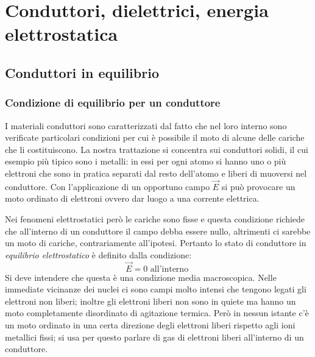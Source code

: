 \documentclass[class=book, crop=false, oneside, 12pt]{standalone}
\begin{document}
\chapter{Conduttori, dielettrici, energia elettrostatica}

\section{Conduttori in equilibrio}

\subsection{Condizione di equilibrio per un conduttore}

I materiali conduttori sono caratterizzati dal fatto che nel loro interno sono verificate particolari condizioni per cui è possibile il moto di alcune delle cariche che li costituiscono.  
La nostra trattazione si concentra sui conduttori solidi, il cui esempio più tipico sono i metalli: in essi per ogni atomo si hanno uno o più elettroni che sono in pratica separati dal resto dell'atomo e liberi di muoversi nel conduttore. 
Con l'applicazione di un opportuno campo \(\overrightarrow{E}\) si può provocare un moto ordinato di elettroni ovvero dar luogo a una corrente elettrica.

Nei fenomeni elettrostatici però le cariche sono fisse e questa condizione richiede che all'interno di un conduttore il campo debba essere nullo, altrimenti ci sarebbe un moto di cariche, contrariamente all'ipotesi. 
Pertanto lo stato di conduttore in \emph{equilibrio elettrostatico} è definito dalla condizione: 
\begin{equation*}
    \overrightarrow{E} = 0 \text{ all'interno }
\end{equation*}
Si deve intendere che questa è una condizione media macroscopica. 
Nelle immediate vicinanze dei nuclei ci sono campi molto intensi che tengono legati gli elettroni non liberi; inoltre gli elettroni liberi non sono in quiete ma hanno un moto completamente disordinato di agitazione termica. 
Però in nessun istante c'è un moto ordinato in una certa direzione degli elettroni liberi rispetto agli ioni metallici fissi; si usa per questo parlare di gas di elettroni liberi all'interno di un conduttore.
\end{document}
